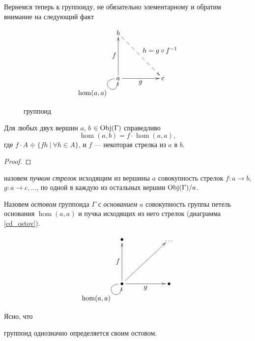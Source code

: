     Вернемся теперь к группоиду, не обязательно элементарному и обратим 
    внимание на следующий факт 

    \begin{figure}[h]
        \centering
        \[\xymatrix{
            b \ar@{-->}[ddrr]^{\textstyle{h=g \circ f^{-1}}} & & \\
            & & \\
            a \ar@(l,d)[]_{\textstyle{\hom(a,a)}} \ar[uu]^{\textstyle{f}} \ar[rr]_{\textstyle{g}} & & c
        }\]
        \caption{группоид}
        \label{cd_Grup}
    \end{figure}

    \begin{statement}
        Для любых двух вершин $a$, $b$ $\in \operatorname*{Obj}(\Gamma)$ справедливо
        \begin{equation}
            \hom(a,b) = f \cdot \hom(a,a),
        \end{equation}
        где $f \cdot A \doteqdot \{fh \:|\: \forall h \in A\}$, и 
        $f$ --- некоторая стрелка из $a$ в $b$.
    \end{statement}
    \begin{proof}
    \end{proof}

    \newpage
    \begin{definition}
        назовем \emph{пучком стрелок} исходящим из вершины $a$ совокупность стрелок 
        $f: a \to b$, $g: a \to c,\ldots$, по одной в каждую из остальных вершин 
        $\operatorname*{Obj}(\Gamma)/{a}$.
    \end{definition}

    \begin{definition}
        Назовем \emph{остовом} группоида $\Gamma$ с \emph{основанием} $a$ 
        совокупность группы петель основания $\hom(a,a)$ и пучка исходящих из 
        него стрелок (диаграмма \eqref{cd_ostov}).
    \end{definition}

    \begin{equation}\label{cd_ostov}
        \xymatrix{
            \bullet  &  & \dots \\
            & & \\
            \bullet \ar@(l,d)[]_{\textstyle{\hom(a,a)}} \ar[uurr] \ar[uu]^{\textstyle{f}} \ar[rr]_{\textstyle{g}} & & \bullet
        }
    \end{equation}

    Ясно, что
    \begin{statement}
        группоид однозначно определяется своим остовом.
    \end{statement}

